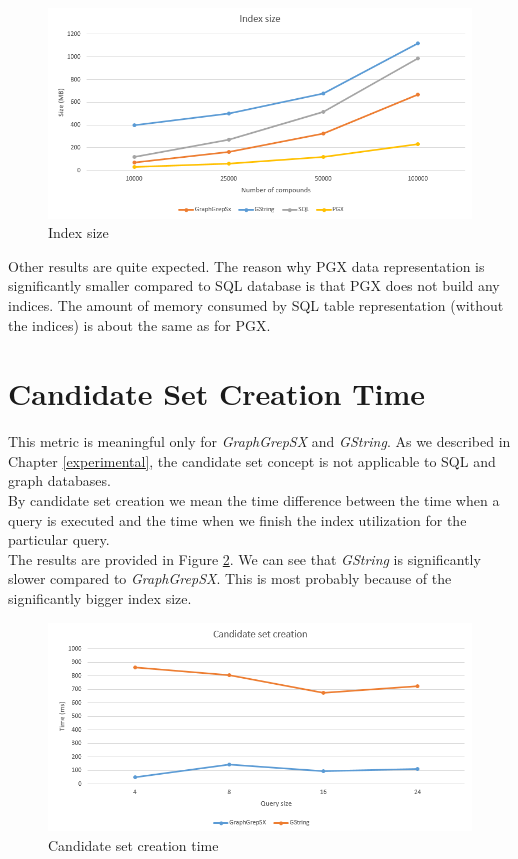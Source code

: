 \begin{figure}[h]
	\centering
	\includegraphics[width=1\textwidth]{../img/indexSize.png}
	\caption{Index size}
	\label{fig:indexsize}
\end{figure}

Other results are quite expected. The reason why PGX data representation is significantly smaller compared to SQL database is that PGX does not build any indices. The amount of memory consumed by SQL table representation (without the indices) is about the same as for PGX.

\section{Candidate Set Creation Time}
This metric is meaningful only for \textit{GraphGrepSX} and \textit{GString}. As we described in Chapter \ref{experimental}, the candidate set concept is not applicable to SQL and graph databases.\\

By candidate set creation we mean the time difference between the time when a query is executed and the time when we finish the index utilization for the particular query.\\

The results are provided in Figure \ref{fig:candidateset}. We can see that \textit{GString} is significantly slower compared to \textit{GraphGrepSX}. This is most probably because of the significantly bigger index size.\\

\begin{figure}[h]
	\centering
	\includegraphics[width=1\textwidth]{../img/candidateSet.png}
	\caption{Candidate set creation time}
	\label{fig:candidateset}
\end{figure}

